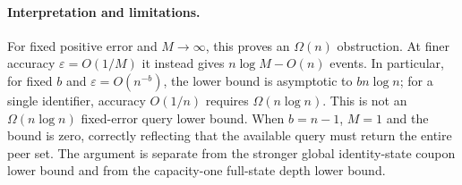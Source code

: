\documentclass[11pt]{article}
\begin{document}
\paragraph{Interpretation and limitations.}
For fixed positive error and $M\to\infty$, this proves an $\Omega(n)$
obstruction. At finer accuracy $\varepsilon=O(1/M)$ it instead gives
$n\log M-O(n)$ events. In particular, for fixed $b$ and
$\varepsilon=O(n^{-b})$, the lower bound is asymptotic to $bn\log n$;
for a single identifier, accuracy $O(1/n)$ requires $\Omega(n\log n)$.
This is not an $\Omega(n\log n)$ fixed-error query lower bound.
When $b=n-1$, $M=1$ and the bound is zero, correctly reflecting that the
available query must return the entire peer set. The argument is separate
from the stronger global identity-state coupon lower bound and from the
capacity-one full-state depth lower bound.
\end{document}
